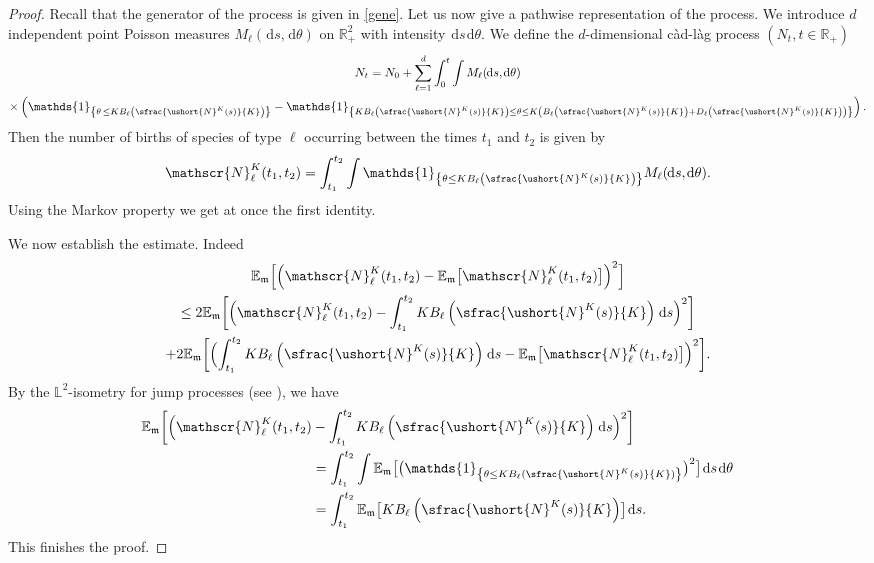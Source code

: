 \documentclass[JEP,XML,SOM,Unicode]{cedram}
\newcommand{\scaleto}[2]{#1}
\let\mathcal\mathscr
\numberwithin{equation}{section}
\theoremstyle{plain}
\theoremstyle{definition}
\newcommand{\E}{{\mathbb{E}}}
\newcommand{\sK}{K}
\newcommand{\un}{\mathds{1}}
\newcommand{\leproc}{\ushort{N}^{K}}
\newcommand{\sleproc}{\ushort{N}^{K}}
\newcommand{\dd}{\hspace{1pt}\mathrm{d}}
\begin{document}
\begin{proof}
Recall that the generator of the process is given in \eqref{gene}. Let us now give a pathwise representation of the process. We introduce $d$
independent point Poisson measures $M_{\ell}(\!\dd s, \!\dd\theta)$ on $\mathds{R}_{\scaleto{+}{4.5pt}}^{2}$ with intensity
$\dd s \dd\theta$. We define the $d$-dimensional càd-làg process $(N_{t}, t\in\mathds{R}_{\scaleto{+}{4.5pt}})$
\begin{multline*}
N_{t} = N_{0} + \sum_{\ell = 1}^d \int_{0}^t \int M_{\ell}(\!\dd s,\! \dd\theta) \\
\times \left(\un_{\left\{\theta\,\leq K B_{\ell}\left(\sfrac{\sleproc(s)}{K}\right)\right\}} -
\un_{\left\{K B_{\ell}\left(\sfrac{\sleproc(s)}{K}\right)\leq \theta\leq K \left(B_{\ell}\left(\sfrac{\sleproc(s)}{K}\right) +
D_{\ell}\left(\sfrac{\sleproc(s)}{\sK}\right)\right)\right\}} \right) .
\end{multline*}
Then the number of births of species of type $\ell$ occurring between the times $t_{1}$ and $t_{2}$ is given by
\[
\mathcal{N}^{\sK}_\ell(t_{1},t_{2}) = \int_{t_{1}}^{t_{2}} \int \un_{\left\{\theta\leq K B_{\ell}\left(\sfrac{\sleproc(s)}{K}\right)\right\}}
M_{\ell}(\!\dd s, \!\dd\theta).
\]
Using the Markov property we get at once the first identity.

We now establish the estimate. Indeed
\begin{multline*}
\E_{\mathfrak{m}}\Bigl[\Bigl(\mathcal{N}^{\sK}_\ell(t_{1},t_{2}) - \E_{\mathfrak{m}}\bigl[\mathcal{N}^{\sK}_\ell(t_{1},t_{2})\bigr]\Bigr)^2\Bigr]
\\
\leq 2\E_{\mathfrak{m}}\biggl[\Bigl(\mathcal{N}^{\sK}_\ell(t_{1},t_{2}) - \int_{t_{1}}^{t_{2}}
K B_{\ell}\left(\sfrac{\leproc(s)}{K}\right) \dd s\Bigr)^2\biggr]\\
+ 2\E_{\mathfrak{m}}\biggl[\Bigl(\int_{t_{1}}^{t_{2}} K B_{\ell}\left(\sfrac{\leproc(s)}{K}\right) \dd s -
\E_{\mathfrak{m}}\bigl[\mathcal{N}^{\sK}_\ell(t_{1},t_{2})\bigr] \Bigr)^2 \biggr].
\end{multline*}
By the $\mathds{L}^2$-isometry for jump processes (see \cite[(3.9) p.\,62]{Ikeda}), we have
\begin{align*}
\E_{\mathfrak{m}}\biggl[\Bigl(\mathcal{N}^{\sK}_\ell(t_{1},t_{2}) &- \int_{t_{1}}^{t_{2}} K B_{\ell}\left(\sfrac{\leproc(s)}{K}\right) \dd s\Bigr)^2\biggr]\\
&= \int_{t_{1}}^{t_{2}} \int \E_{\mathfrak{m}}\bigl[\bigl(\un_{\left\{\theta\leq K B_{\ell}(\sfrac{\sleproc(s)}{K})\right\}}\bigr)^2 \bigr]\dd s \dd \theta \\
&= \int_{t_{1}}^{t_{2}} \E_{\mathfrak{m}}\bigl[K B_{\ell}\left(\sfrac{\leproc(s)}{K}\right) \bigr]\dd s.
\end{align*}
This finishes the proof.
\end{proof}
\end{document}
